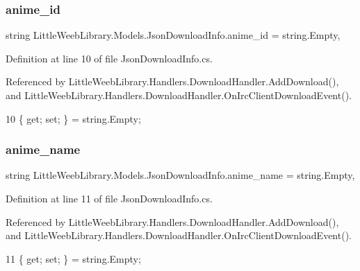 \subsubsection{\texorpdfstring{anime\+\_\+id}{anime\_id}}
{\footnotesize\ttfamily string Little\+Weeb\+Library.\+Models.\+Json\+Download\+Info.\+anime\+\_\+id = string.\+Empty\hspace{0.3cm}{\ttfamily [get]}, {\ttfamily [set]}}



Definition at line 10 of file Json\+Download\+Info.\+cs.



Referenced by Little\+Weeb\+Library.\+Handlers.\+Download\+Handler.\+Add\+Download(), and Little\+Weeb\+Library.\+Handlers.\+Download\+Handler.\+On\+Irc\+Client\+Download\+Event().


\begin{DoxyCode}
10 \{ \textcolor{keyword}{get}; \textcolor{keyword}{set}; \} = \textcolor{keywordtype}{string}.Empty;
\end{DoxyCode}
\mbox{\label{class_little_weeb_library_1_1_models_1_1_json_download_info_a27d95ac59e5a4bf7f68421e9ea0036db}} 
\subsubsection{\texorpdfstring{anime\+\_\+name}{anime\_name}}
{\footnotesize\ttfamily string Little\+Weeb\+Library.\+Models.\+Json\+Download\+Info.\+anime\+\_\+name = string.\+Empty\hspace{0.3cm}{\ttfamily [get]}, {\ttfamily [set]}}



Definition at line 11 of file Json\+Download\+Info.\+cs.



Referenced by Little\+Weeb\+Library.\+Handlers.\+Download\+Handler.\+Add\+Download(), and Little\+Weeb\+Library.\+Handlers.\+Download\+Handler.\+On\+Irc\+Client\+Download\+Event().


\begin{DoxyCode}
11 \{ \textcolor{keyword}{get}; \textcolor{keyword}{set}; \} = \textcolor{keywordtype}{string}.Empty;
\end{DoxyCode}
\mbox{\label{class_little_weeb_library_1_1_models_1_1_json_download_info_ae74efeee78e915f2fff1eb34bfd125f5}} 
